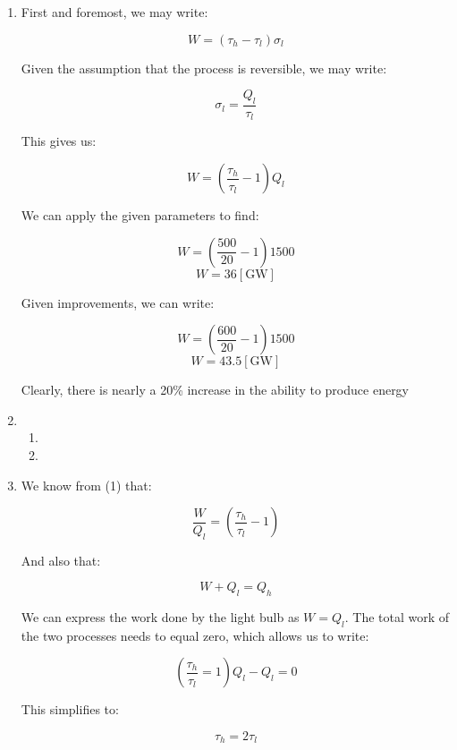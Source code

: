 \begin{enumerate}
\begin{enumerate}
      \item 
        
      \item 
        
    \end{enumerate}

    \setcounter{enumi}{4}

  \item

    First and foremost, we may write:

    $$W=(\tau_h-\tau_l)\sigma_l$$

    Given the assumption that the process is reversible, we may write:

    $$\sigma_l=\frac{Q_l}{\tau_l}$$

    This gives us:

    $$W=\left( \frac{\tau_h}{\tau_l}-1 \right)Q_l$$

    We can apply the given parameters to find:

    $$W=\left( \frac{500}{20}-1 \right)1500$$
    $$\boxed{W=36[\si{\giga\watt}]}$$

    Given improvements, we can write:

    $$W=\left( \frac{600}{20}-1 \right)1500$$
    $$\boxed{W=43.5[\si{\giga\watt}]}$$

    Clearly, there is nearly a 20\% increase in the ability to produce energy

  \item

    \begin{enumerate}

      \item 

      \item 

    \end{enumerate}

  \item

    We know from (1) that:

    $$\frac{W}{Q_l}=\left( \frac{\tau_h}{\tau_l}-1 \right)$$

    And also that:

    $$W+Q_l=Q_h$$

    We can express the work done by the light bulb as $W=Q_l$. The total work of the two processes needs to equal zero, which allows us to write:

    $$\left( \frac{\tau_h}{\tau_l}=1 \right)Q_l-Q_l=0$$

    This simplifies to:

    $$\tau_h=2\tau_l$$

\end{enumerate}



